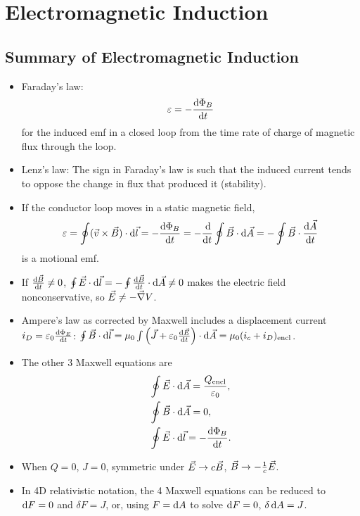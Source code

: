 \chapter{Electromagnetic Induction}

\section{Summary of Electromagnetic Induction}
\begin{itemize}
	\item Faraday's law:
	\begin{equation}
	\varepsilon = -\frac{\operatorname{d\!} \Phi_B}{\operatorname{d\!} t} 
	\end{equation}
	for the induced emf in a closed loop from the time rate of charge of magnetic flux through the loop.
	
	\item Lenz's law: The sign in Faraday's law is such that the induced current tends to oppose the change in flux that produced it (stability).
	
	\item If the conductor loop moves in a static magnetic field,
	\begin{equation}
	\varepsilon = \oint (\vec{v} \times \Bv) \cdot \di \vec{l} = -\dfrac{\di \Phi_B}{\di t} = -\dfrac{\di}{\di t} \oint \Bv\cdot\di\vec{A} = -\oint\Bv\cdot\dfrac{\di \vec{A}}{\di t} 
	\end{equation}
	is a motional emf.
	
	\item If $\frac{\operatorname{d\!} \vec{B}}{\operatorname{d\!} t} \neq 0$, $\oint \vec{E} \cdot \operatorname{d\!} \vec{l} = -\oint\frac{\operatorname{d\!} \vec{B}}{\operatorname{d\!} t} \cdot \operatorname{d\!} \vec{A} \neq 0$ makes the electric field nonconservative, so $\vec{E} \neq -\vec{\nabla} V$.
	
	\item Ampere's law as corrected by Maxwell includes a displacement current $i_D = \varepsilon_0 \frac{\operatorname{d\!} \Phi_E}{\operatorname{d\!} t}$: $\oint \vec{B} \cdot \operatorname{d\!}\vec{l} = \mu_0 \int \left( \vec{J} + \varepsilon_0 \frac{\operatorname{d\!} \vec{E}}{\operatorname{d\!} t} \right) \cdot \operatorname{d\!} \vec{A} = \mu_0(i_c + i_D)_\text{encl}$.
	
	\item The other 3 Maxwell equations are
	\begin{align}
	&\oint \vec{E} \cdot \operatorname{d\!} \vec{A} = \dfrac{Q_\text{encl}}{\varepsilon_0}, \\
	&\oint \vec{B} \cdot \operatorname{d\!} \vec{A} = 0, \\
	&\oint \vec{E} \cdot \operatorname{d\!} \vec{l} = -\dfrac{\operatorname{d\!} \Phi_B}{\operatorname{d\!} t}.
	\end{align}
	
	\item When $Q=0$, $J=0$, symmetric under $\vec{E} \to c\vec{B}$, $\vec{B} \to -\frac{1}{c}\vec{E}$.
	
	\item In 4D relativistic notation, the 4 Maxwell equations can be reduced to $\operatorname{d\!} F = 0$ and $\delta F = J$, or, using $F = \operatorname{d\!} A$ to solve $\operatorname{d\!} F = 0$, $\delta \operatorname{d\!} A = J$.
\end{itemize}